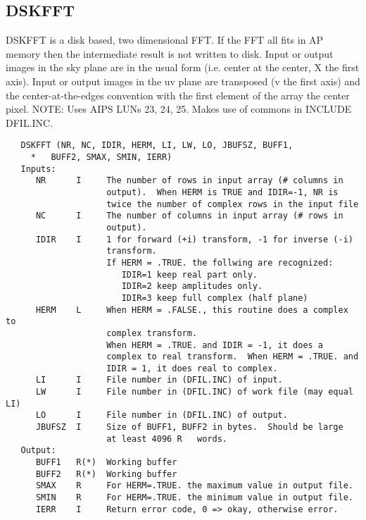 \subsection{DSKFFT}
DSKFFT is a disk based, two dimensional FFT.  If the FFT all fits
in AP memory then the intermediate result is not written to disk.
Input or output images in the sky plane are in the usual form
(i.e. center at the center, X the first axis).  Input or output
images in the uv plane are transposed (v the first axis) and the
center-at-the-edges convention with the first element of the array
the center pixel.    NOTE: Uses AIPS LUNs 23, 24, 25.
   Makes use of commons in INCLUDE DFIL.INC.
\begin{verbatim}
   DSKFFT (NR, NC, IDIR, HERM, LI, LW, LO, JBUFSZ, BUFF1,
     *   BUFF2, SMAX, SMIN, IERR)
   Inputs:
      NR      I     The number of rows in input array (# columns in
                    output).  When HERM is TRUE and IDIR=-1, NR is
                    twice the number of complex rows in the input file
      NC      I     The number of columns in input array (# rows in
                    output).
      IDIR    I     1 for forward (+i) transform, -1 for inverse (-i)
                    transform.
                    If HERM = .TRUE. the follwing are recognized:
                       IDIR=1 keep real part only.
                       IDIR=2 keep amplitudes only.
                       IDIR=3 keep full complex (half plane)
      HERM    L     When HERM = .FALSE., this routine does a complex to
                    complex transform.
                    When HERM = .TRUE. and IDIR = -1, it does a
                    complex to real transform.  When HERM = .TRUE. and
                    IDIR = 1, it does real to complex.
      LI      I     File number in (DFIL.INC) of input.
      LW      I     File number in (DFIL.INC) of work file (may equal LI)
      LO      I     File number in (DFIL.INC) of output.
      JBUFSZ  I     Size of BUFF1, BUFF2 in bytes.  Should be large
                    at least 4096 R   words.
   Output:
      BUFF1   R(*)  Working buffer
      BUFF2   R(*)  Working buffer
      SMAX    R     For HERM=.TRUE. the maximum value in output file.
      SMIN    R     For HERM=.TRUE. the minimum value in output file.
      IERR    I     Return error code, 0 => okay, otherwise error.
\end{verbatim}

